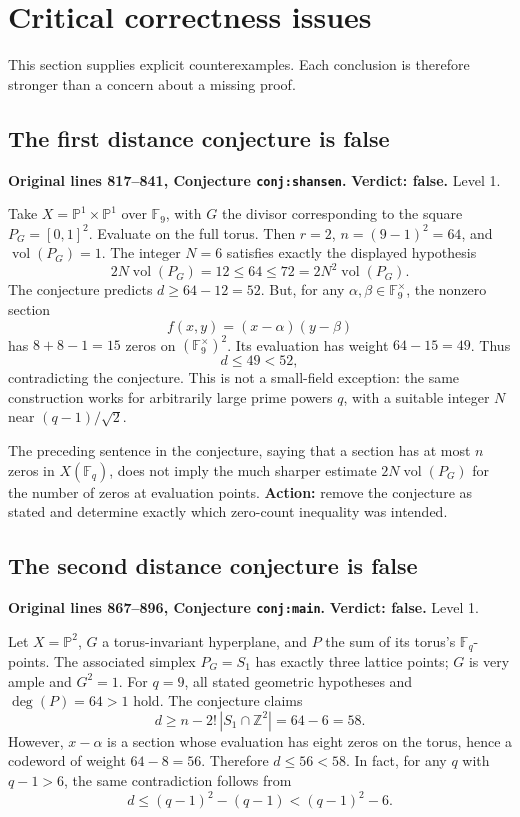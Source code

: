 \documentclass[12pt,letterpaper]{article}
\DeclareMathOperator{\vol}{vol}
\newcommand{\F}{\mathbb F}
\newcommand{\Z}{\mathbb Z}
\newcommand{\PP}{\mathbb P}
\newcommand{\err}[1]{\textbf{#1}}
\newcommand{\level}[1]{\textsf{Level #1}}
\begin{document}
\section{Critical correctness issues}\label{sec:critical}
This section supplies explicit counterexamples.  Each conclusion is therefore stronger than a concern about a missing proof.

\subsection{The first distance conjecture is false}\label{sec:conjone}
\textbf{Original lines 817--841, Conjecture \texttt{conj:shansen}.}\quad
\err{Verdict: false.} \level{1}.

Take $X=\PP^1\times\PP^1$ over $\F_9$, with $G$ the divisor corresponding to the square $P_G=[0,1]^2$.  Evaluate on the full torus.  Then $r=2$, $n=(9-1)^2=64$, and $\vol(P_G)=1$.  The integer $N=6$ satisfies exactly the displayed hypothesis
\[
2N\vol(P_G)=12\le64\le72=2N^2\vol(P_G).
\]
The conjecture predicts $d\ge64-12=52$.  But, for any $\alpha,\beta\in\F_9^\times$, the nonzero section
\[
f(x,y)=(x-\alpha)(y-\beta)
\]
has $8+8-1=15$ zeros on $(\F_9^\times)^2$.  Its evaluation has weight $64-15=49$.  Thus
\[
\boxed{d\le49<52,}
\]
contradicting the conjecture.  This is not a small-field exception: the same construction works for arbitrarily large prime powers $q$, with a suitable integer $N$ near $(q-1)/\sqrt2$.

The preceding sentence in the conjecture, saying that a section has at most $n$ zeros in $X(\F_q)$, does not imply the much sharper estimate $2N\vol(P_G)$ for the number of zeros at evaluation points.  \textbf{Action:} remove the conjecture as stated and determine exactly which zero-count inequality was intended.

\subsection{The second distance conjecture is false}\label{sec:conjtwo}
\textbf{Original lines 867--896, Conjecture \texttt{conj:main}.}\quad
\err{Verdict: false.} \level{1}.

Let $X=\PP^2$, $G$ a torus-invariant hyperplane, and $P$ the sum of its torus's $\F_q$-points.  The associated simplex $P_G=S_1$ has exactly three lattice points; $G$ is very ample and $G^2=1$.  For $q=9$, all stated geometric hypotheses and $\deg(P)=64>1$ hold.  The conjecture claims
\[
d\ge n-2!\,|S_1\cap\Z^2|=64-6=58.
\]
However, $x-\alpha$ is a section whose evaluation has eight zeros on the torus, hence a codeword of weight $64-8=56$.  Therefore $d\le56<58$.  In fact, for any $q$ with $q-1>6$, the same contradiction follows from
\[
d\le(q-1)^2-(q-1)<(q-1)^2-6.
\]
\end{document}
